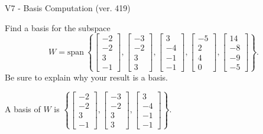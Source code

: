 \begin{exercise}
  \begin{exerciseTitle}V7 - Basis Computation (ver. 419)\end{exerciseTitle}
  \begin{exerciseStatement}
    Find a basis for the subspace 
\[W=\mathrm{span}\ \left\{\left[\begin{array}{r}
-2 \\
-2 \\
3 \\
-1
\end{array}\right] , \left[\begin{array}{r}
-3 \\
-2 \\
3 \\
3
\end{array}\right] , \left[\begin{array}{r}
3 \\
-4 \\
-1 \\
-1
\end{array}\right] , \left[\begin{array}{r}
-5 \\
2 \\
4 \\
0
\end{array}\right] , \left[\begin{array}{r}
14 \\
-8 \\
-9 \\
-5
\end{array}\right]\right\}.\]
 Be sure to explain why your result is a basis.


  \end{exerciseStatement}
  \begin{exerciseAnswer}
   A basis of \(W\) is  \(\left\{\left[\begin{array}{r}
-2 \\
-2 \\
3 \\
-1
\end{array}\right] , \left[\begin{array}{r}
-3 \\
-2 \\
3 \\
3
\end{array}\right] , \left[\begin{array}{r}
3 \\
-4 \\
-1 \\
-1
\end{array}\right]\right\}\).
  


  \end{exerciseAnswer}
\end{exercise}